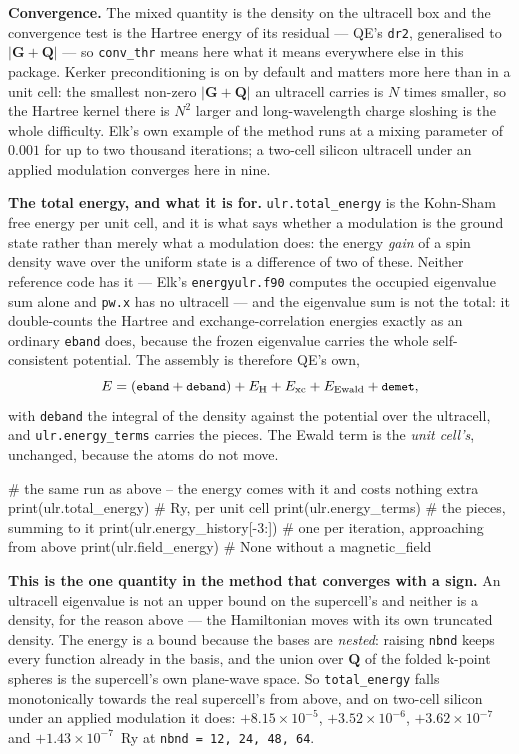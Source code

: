 \documentclass[11pt,a4paper]{article}
\newcommand{\code}[1]{\texttt{\small #1}}
\begin{document}
\textbf{Convergence.} The mixed quantity is the density on the ultracell box and
the convergence test is the Hartree energy of its residual --- QE's \code{dr2},
generalised to $|\mathbf G + \mathbf Q|$ --- so \code{conv\_thr} means here what
it means everywhere else in this package. Kerker preconditioning is on by
default and matters more here than in a unit cell: the smallest non-zero
$|\mathbf G+\mathbf Q|$ an ultracell carries is $N$ times smaller, so the
Hartree kernel there is $N^2$ larger and long-wavelength charge sloshing is the
whole difficulty. Elk's own example of the method runs at a mixing parameter of
$0.001$ for up to two thousand iterations; a two-cell silicon ultracell under an
applied modulation converges here in nine.

\textbf{The total energy, and what it is for.} \code{ulr.total\_energy} is the
Kohn-Sham free energy per unit cell, and it is what says whether a modulation is
the ground state rather than merely what a modulation does: the energy
\emph{gain} of a spin density wave over the uniform state is a difference of two
of these. Neither reference code has it --- Elk's \code{energyulr.f90} computes
the occupied eigenvalue sum alone and \code{pw.x} has no ultracell --- and the
eigenvalue sum is not the total: it double-counts the Hartree and
exchange-correlation energies exactly as an ordinary \code{eband} does, because
the frozen eigenvalue carries the whole self-consistent potential. The
assembly is therefore QE's own,
\[
  E = (\code{eband} + \code{deband}) + E_{\mathrm H} + E_{\mathrm{xc}}
      + E_{\mathrm{Ewald}} + \code{demet},
\]
with \code{deband} the integral of the density against the potential over the
ultracell, and \code{ulr.energy\_terms} carries the pieces. The Ewald term is the
\emph{unit cell's}, unchanged, because the atoms do not move.

\begin{pycode}
# the same run as above -- the energy comes with it and costs nothing extra
print(ulr.total_energy)                # Ry, per unit cell
print(ulr.energy_terms)                # the pieces, summing to it
print(ulr.energy_history[-3:])         # one per iteration, approaching from above
print(ulr.field_energy)                # None without a magnetic_field
\end{pycode}

\textbf{This is the one quantity in the method that converges with a sign.} An
ultracell eigenvalue is not an upper bound on the supercell's and neither is a
density, for the reason above --- the Hamiltonian moves with its own truncated
density. The energy is a bound because the bases are \emph{nested}: raising
\code{nbnd} keeps every function already in the basis, and the union over
$\mathbf Q$ of the folded k-point spheres is the supercell's own plane-wave
space. So \code{total\_energy} falls monotonically towards the real supercell's
from above, and on two-cell silicon under an applied modulation it does:
$+8.15\times10^{-5}$, $+3.52\times10^{-6}$, $+3.62\times10^{-7}$ and
$+1.43\times10^{-7}$~Ry at \code{nbnd = 12, 24, 48, 64}.
\end{document}
